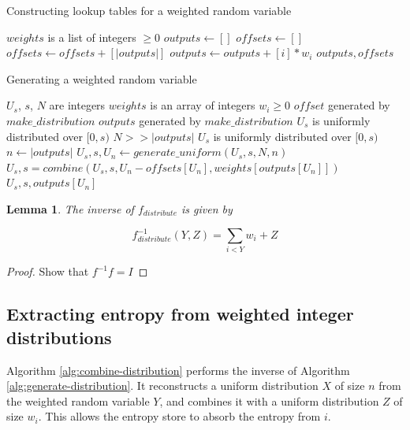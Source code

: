 \documentclass[12pt]{article}
\newtheorem{lemma}{Lemma}
\begin{document}
\begin{algorithm}
\caption{Constructing lookup tables for a weighted random variable}
\label{alg:generate-lookup-tables}
\begin{algorithmic}[1]
\Require $weights$ is a list of integers $\ge0$
  \State $outputs \gets []$
  \State $offsets \gets []$
    \State $offsets \gets offsets + [|outputs|]$
    \State $outputs \gets outputs + [i] * w_i$
  \EndFor
  \State \Return $outputs, offsets$
\EndProcedure
\end{algorithmic}
\end{algorithm}


\begin{algorithm}
\caption{Generating a weighted random variable}
\label{alg:generate-distribution}
\begin{algorithmic}[1]
\Require $U_s$, $s$, $N$ are integers
\Require $weights$ is an array of integers $w_i \ge 0$
\Require $offset$ generated by $make\_distribution$ 
\Require $outputs$ generated by $make\_distribution$
\Require $U_s$ is uniformly distributed over $[0,s)$
\Require $N >> |outputs|$
\Ensure $U_s$ is uniformly distributed over $[0,s)$
    \State $n \gets |outputs|$
    \State $U_s, s, U_n \gets generate\_uniform(U_s, s, N, n)$
    \State $U_s, s = combine(U_s, s, U_n - offsets[U_n], weights[outputs[U_n]])$
    \State \Return $U_s, s, outputs[U_n]$
\EndProcedure
\end{algorithmic}
\end{algorithm}


\begin{lemma}
The inverse of $f_{distribute}$ is given by

    \begin{equation}
    f^{-1}_{distribute}(Y,Z) = \sum_{i<Y}w_i + Z
    \end{equation}
\end{lemma}

\begin{proof}
    Show that $f^{-1}f= I$

\end{proof}

\subsection {Extracting entropy from weighted integer distributions}

Algorithm \ref{alg:combine-distribution} performs the inverse of Algorithm \ref{alg:generate-distribution}. It reconstructs a uniform distribution $X$ of size $n$ from the weighted random variable $Y$, and combines it with a uniform distribution $Z$ of size $w_i$. This allows the entropy store to absorb the entropy from $i$.
\end{document}
